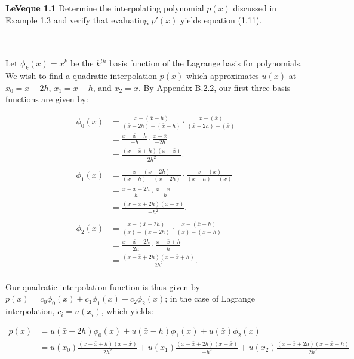 \textbf{LeVeque 1.1} 
Determine the interpolating polynomial $p(x)$ discussed in Example 1.3 and verify that evaluating $p'(x)$ yields 
equation (1.11).

\begin{solution}\ \\\\
    Let $\phi_k(x) = x^k$ be the $k^{th}$ basis function of the Lagrange basis for polynomials. We wish to find a 
    quadratic interpolation $p(x)$ which approximates $u(x)$ at $x_0 = \bar{x} - 2h$, $x_1 = \bar{x} - h$, and 
    $x_2 = \bar{x}$.  By Appendix B.2.2, our first three basis functions are given by:

    \begin{align*}
        \phi_0(x) &= \frac{x - (\bar{x} - h)}{(\bar{x} - 2h) - (\bar{x} - h)} \cdot \frac{x - (\bar{x})}{(\bar{x} - 2h) - (\bar{x})} \\
                  &= \frac{x - \bar{x} + h}{-h} \cdot \frac{x - \bar{x}}{-2h} \\
                  &= \frac{(x - \bar{x} + h)(x - \bar{x})}{2h^2}. \\\\
        \phi_1(x) &= \frac{x - (\bar{x} - 2h)}{(\bar{x} - h) - (\bar{x} - 2h)} \cdot \frac{x - (\bar{x})}{(\bar{x} - h) - (\bar{x})} \\
                  &= \frac{x - \bar{x} + 2h}{h} \cdot \frac{x - \bar{x}}{-h} \\
                  &= \frac{(x - \bar{x} + 2h)(x - \bar{x})}{-h^2}. \\\\
        \phi_2(x) &= \frac{x - (\bar{x} - 2h)}{(\bar{x}) - (\bar{x} - 2h)} \cdot \frac{x - (\bar{x} - h)}{(\bar{x}) - (\bar{x} - h)} \\
                  &= \frac{x - \bar{x} + 2h}{2h} \cdot \frac{x - \bar{x} + h}{h} \\
                  &= \frac{(x - \bar{x} + 2h)(x - \bar{x} + h)}{2h^2}. \\
    \end{align*}

    Our quadratic interpolation function is thus given by $p(x) = c_0\phi_0(x) + c_1\phi_1(x) + c_2\phi_2(x)$; in the 
    case of Lagrange interpolation, $c_i = u(x_i)$, which yields:

    \begin{align*}
        p(x) &= u(\bar{x} - 2h)\phi_0(x) + u(\bar{x} - h)\phi_1(x) + u(\bar{x})\phi_2(x) \\
             &= u(x_0)\frac{(x - \bar{x} + h)(x - \bar{x})}{2h^2} 
              + u(x_1)\frac{(x - \bar{x} + 2h)(x - \bar{x})}{-h^2}
              + u(x_2)\frac{(x - \bar{x} + 2h)(x - \bar{x} + h)}{2h^2}
    \end{align*}


\end{solution}
